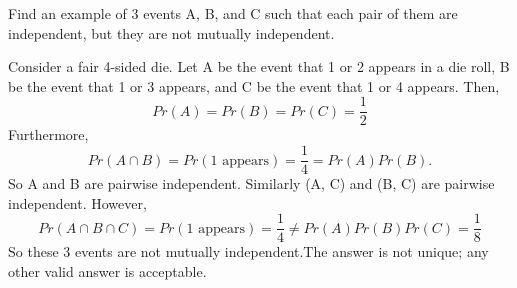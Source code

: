 \question Find an example of 3 events A, B, and C such that each pair 
of them are independent, but they are not mutually independent.
\begin{solution}[2 cm]
Consider a fair 4-sided die. Let A be the event that 1 or 2 appears in 
a die roll, B be the event that 1 or 3 appears, and C be the event 
that 1 or 4 appears. Then, 
\[Pr(A) = Pr(B) = Pr(C) = \frac{1}{2}\] 
Furthermore, 
\[Pr(A \cap B) = Pr({1\text{ appears}}) = \frac{1}{4} = Pr(A) Pr(B).\]
So A and B are pairwise independent. Similarly (A, C) and (B, C) are 
pairwise independent. However, 
\[Pr(A \cap B \cap C) = Pr({1\text{ appears}}) = \frac{1}{4} \neq Pr(A) 
Pr(B) Pr(C) = \frac{1}{8}\]
So these 3 events are not mutually independent.The answer is not unique; 
any other valid answer is acceptable.
 \end{solution}
